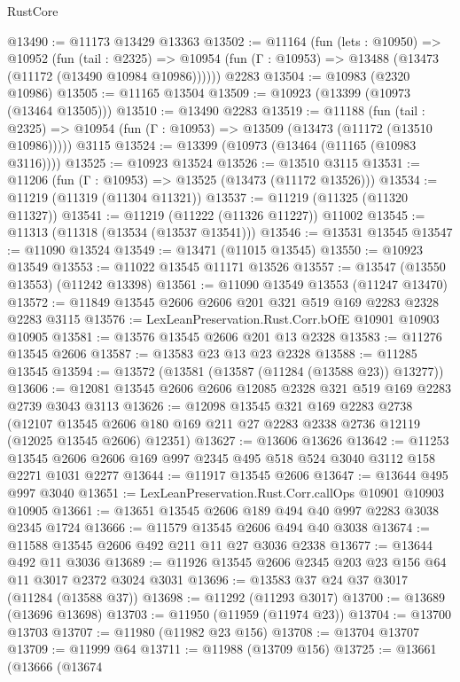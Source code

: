 \begin{lexlean}{RustCore}
\begin{coremodule}
@13490 := @11173 @13429 @13363
@13502 := @11164
    (fun (lets : @10950) =>
    @10952
      (fun (tail : @2325) =>
      @10954 (fun (Γ : @10953) => @13488 (@13473 (@11172 (@13490 @10984 @10986))))))
    @2283
@13504 := @10983 (@2320 @10986)
@13505 := @11165 @13504
@13509 := @10923 (@13399 (@10973 (@13464 @13505)))
@13510 := @13490 @2283
@13519 := @11188
    (fun (tail : @2325) => @10954 (fun (Γ : @10953) => @13509 (@13473 (@11172 (@13510 @10986)))))
    @3115
@13524 := @13399 (@10973 (@13464 (@11165 (@10983 @3116))))
@13525 := @10923 @13524
@13526 := @13510 @3115
@13531 := @11206 (fun (Γ : @10953) => @13525 (@13473 (@11172 @13526)))
@13534 := @11219 (@11319 (@11304 @11321))
@13537 := @11219 (@11325 (@11320 @11327))
@13541 := @11219 (@11222 (@11326 @11227)) @11002
@13545 := @11313 (@11318 (@13534 (@13537 @13541)))
@13546 := @13531 @13545
@13547 := @11090 @13524
@13549 := @13471 (@11015 @13545)
@13550 := @10923 @13549
@13553 := @11022 @13545 @11171 @13526
@13557 := @13547 (@13550 @13553) (@11242 @13398)
@13561 := @11090 @13549 @13553 (@11247 @13470)
@13572 := @11849 @13545 @2606 @2606 @201 @321 @519 @169 @2283 @2328 @2283 @3115
@13576 := LexLeanPreservation.Rust.Corr.bOfE @10901 @10903 @10905
@13581 := @13576 @13545 @2606 @201 @13 @2328
@13583 := @11276 @13545 @2606
@13587 := @13583 @23 @13 @23 @2328
@13588 := @11285 @13545
@13594 := @13572 (@13581 (@13587 (@11284 (@13588 @23)) @13277))
@13606 := @12081 @13545 @2606 @2606 @12085 @2328 @321 @519 @169 @2283 @2739 @3043 @3113
@13626 := @12098
    @13545
    @321
    @169
    @2283
    @2738
    (@12107 @13545 @2606 @180 @169 @211 @27 @2283 @2338 @2736 @12119 (@12025 @13545 @2606) @12351)
@13627 := @13606 @13626
@13642 := @11253
    @13545
    @2606
    @2606
    @169
    @997
    @2345
    @495
    @518
    @524
    @3040
    @3112
    @158
    @2271
    @1031
    @2277
@13644 := @11917 @13545 @2606
@13647 := @13644 @495 @997 @3040
@13651 := LexLeanPreservation.Rust.Corr.callOps @10901 @10903 @10905
@13661 := @13651 @13545 @2606 @189 @494 @40 @997 @2283 @3038 @2345 @1724
@13666 := @11579 @13545 @2606 @494 @40 @3038
@13674 := @11588 @13545 @2606 @492 @211 @11 @27 @3036 @2338
@13677 := @13644 @492 @11 @3036
@13689 := @11926 @13545 @2606 @2345 @203 @23 @156 @64 @11 @3017 @2372 @3024 @3031
@13696 := @13583 @37 @24 @37 @3017 (@11284 (@13588 @37))
@13698 := @11292 (@11293 @3017)
@13700 := @13689 (@13696 @13698)
@13703 := @11950 (@11959 (@11974 @23))
@13704 := @13700 @13703
@13707 := @11980 (@11982 @23 @156)
@13708 := @13704 @13707
@13709 := @11999 @64
@13711 := @11988 (@13709 @156)
@13725 := @13661
    (@13666
      (@13674

\end{coremodule}
\end{lexlean}
